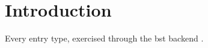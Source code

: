 \documentclass[acmsmall,nonacm]{acmart}
\begin{document}
\thispagestyle{empty}%

\section{Introduction}
Every entry type, exercised through the bst backend \cite{Cohen07,JCohen96,Kosiur01,Editor00,Editor00a,Spector90,Andler79,anisi03,Clarkson85,Harel78,Thornburg01,CleanManual,Poker06,Reiser2014,Baggett2025,Bornmann2019,R,UMassCitations,CleanProc20,CleanBooklet}.



\end{document}
